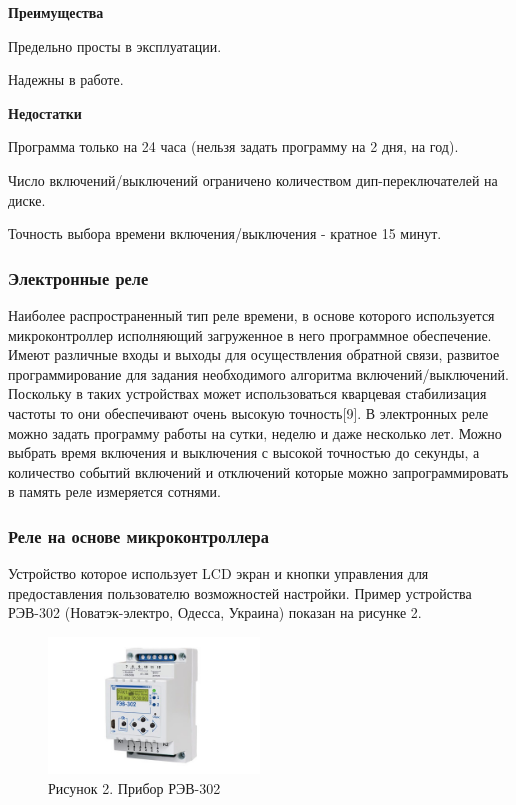 \textbf{Преимущества}
\begin{my_enumerate}
\item Предельно просты в эксплуатации.
\item Надежны в работе.
\end{my_enumerate}

\textbf{Недостатки}
\begin{my_enumerate}
\item Программа только на 24 часа (нельзя задать программу на 2 дня, на год).
\item Число включений/выключений ограничено количеством дип-переключателей на диске.
\item Точность выбора времени включения/выключения - кратное 15 минут.
\end{my_enumerate}


\subsubsection{Электронные реле}
Наиболее распространенный тип реле времени, в основе которого используется микроконтроллер исполняющий загруженное в него программное обеспечение. Имеют различные входы и выходы для осуществления обратной связи, развитое программирование для задания необходимого алгоритма включений/выключений.  Поскольку в таких устройствах может использоваться кварцевая стабилизация частоты то они обеспечивают очень высокую точность[9]. В электронных реле можно задать программу работы на сутки, неделю и даже несколько лет. Можно выбрать время включения и выключения с высокой точностью до секунды, а количество событий включений и отключений которые можно запрограммировать в память реле измеряется сотнями. 

\subsubsection*{Реле на основе микроконтроллера}

Устройство которое использует LCD экран и кнопки управления для предоставления пользователю возможностей настройки.
Пример устройства РЭВ-302 (Новатэк-электро, Одесса, Украина) показан на рисунке 2.

\begin{figure}[h!]
    \centering
    \includegraphics[width=0.5\textwidth]{rev302.png}
    \caption{Рисунок 2. Прибор РЭВ-302}
\end{figure}


